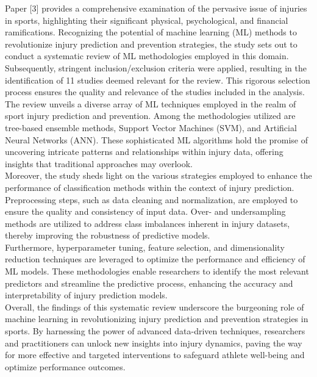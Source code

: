 \documentclass[12pt, English]{article}
\begin{document}
\begin{normalsize}
Paper [3] provides a comprehensive examination of the pervasive issue of injuries in sports, highlighting their significant physical, psychological, and financial ramifications. Recognizing the potential of machine learning (ML) methods to revolutionize injury prediction and prevention strategies, the study sets out to conduct a systematic review of ML methodologies employed in this domain.\\
 Subsequently, stringent inclusion/exclusion criteria were applied, resulting in the identification of 11 studies deemed relevant for the review. This rigorous selection process ensures the quality and relevance of the studies included in the analysis.\\
The review unveils a diverse array of ML techniques employed in the realm of sport injury prediction and prevention. Among the methodologies utilized are tree-based ensemble methods, Support Vector Machines (SVM), and Artificial Neural Networks (ANN). These sophisticated ML algorithms hold the promise of uncovering intricate patterns and relationships within injury data, offering insights that traditional approaches may overlook.\\
Moreover, the study sheds light on the various strategies employed to enhance the performance of classification methods within the context of injury prediction. Preprocessing steps, such as data cleaning and normalization, are employed to ensure the quality and consistency of input data. Over- and undersampling methods are utilized to address class imbalances inherent in injury datasets, thereby improving the robustness of predictive models.\\
Furthermore, hyperparameter tuning, feature selection, and dimensionality reduction techniques are leveraged to optimize the performance and efficiency of ML models. These methodologies enable researchers to identify the most relevant predictors and streamline the predictive process, enhancing the accuracy and interpretability of injury prediction models.\\
Overall, the findings of this systematic review underscore the burgeoning role of machine learning in revolutionizing injury prediction and prevention strategies in sports. By harnessing the power of advanced data-driven techniques, researchers and practitioners can unlock new insights into injury dynamics, paving the way for more effective and targeted interventions to safeguard athlete well-being and optimize performance outcomes.
\\


\end{normalsize}
\end{document}
